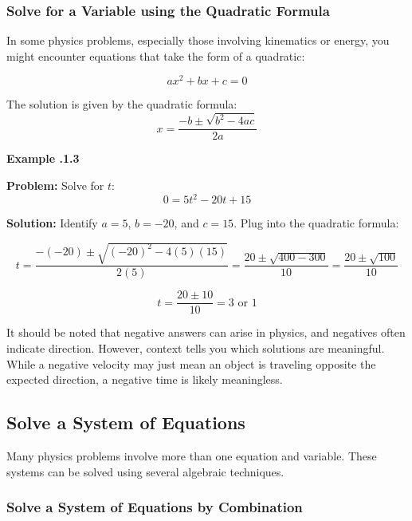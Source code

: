 \subsubsection{Solve for a Variable using the Quadratic Formula} 

In some physics problems, especially those involving kinematics or energy, you might encounter equations that take the form of a quadratic:

\[
ax^2 + bx + c = 0
\]

The solution is given by the quadratic formula:
\[
x = \frac{-b \pm \sqrt{b^2 - 4ac}}{2a}
\]

\begin{mdframed}[backgroundcolor=blue!10!white]
	\begin{center}
		
		
		\textbf{Example \thesection.1.3}	
	\end{center}
	
	\textbf{Problem:}
	Solve for \( t \):
	\[
	0 = 5t^2 - 20t + 15
	\]


\textbf{Solution:} Identify \( a = 5 \), \( b = -20 \), and \( c = 15 \). Plug into the quadratic formula:

\[
t = \frac{-(-20) \pm \sqrt{(-20)^2 - 4(5)(15)}}{2(5)} = \frac{20 \pm \sqrt{400 - 300}}{10} = \frac{20 \pm \sqrt{100}}{10}
\]

\[
t = \frac{20 \pm 10}{10} = 3 \text{ or } 1
\]

It should be noted that negative answers can arise in physics, and negatives often indicate direction.  However, context tells you which solutions are meaningful.  While a negative velocity may just mean an object is traveling opposite the expected direction, a negative time is likely meaningless.

\end{mdframed}
\newpage

\subsection{Solve a System of Equations}

Many physics problems involve more than one equation and variable. These systems can be solved using several algebraic techniques.

\subsubsection{Solve a System of Equations by Combination}

